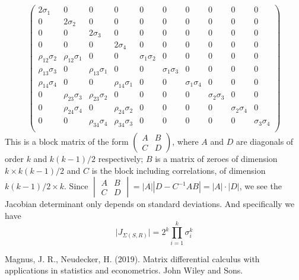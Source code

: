 \documentclass{article}
\begin{document}
$$
\begin{pmatrix}
2 \sigma_1 & 0 & 0 & 0 & 0 & 0 & 0 & 0 & 0 & 0 \\ 
0 & 2 \sigma_2 & 0 & 0 & 0 & 0 & 0 & 0 & 0 & 0 \\ 
0 & 0 & 2 \sigma_3 & 0 & 0 & 0 & 0 & 0 & 0 & 0 \\ 
0 & 0 & 0 & 2 \sigma_4 & 0 & 0 & 0 & 0 & 0 & 0 \\ 
\rho_{12} \sigma_2 & \rho_{12} \sigma_1 & 0 & 0 & \sigma_1 \sigma_2 & 0 & 0 & 0 & 0 & 0 \\
\rho_{13} \sigma_3 & 0 &\rho_{13} \sigma_1  & 0 &  0 & \sigma_1 \sigma_3 & 0 & 0 & 0 & 0 \\
\rho_{14} \sigma_4 & 0 & 0 &  \rho_{14} \sigma_1 & 0 & 0 & \sigma_1 \sigma_4 & 0 & 0 & 0  \\
0 & \rho_{23} \sigma_3 & \rho_{23} \sigma_2 & 0 & 0 & 0 & 0 & \sigma_2 \sigma_3 & 0 & 0 \\
0 & \rho_{24} \sigma_4 & 0 & \rho_{24} \sigma_2 & 0 & 0 & 0 & 0 & \sigma_2 \sigma_4 & 0 \\
0 & 0 & \rho_{34} \sigma_4 & \rho_{34} \sigma_3 & 0 & 0 & 0 & 0 & 0 & \sigma_3 \sigma_4 \\
\end{pmatrix}
$$
This is a block matrix of the form $\begin{pmatrix} A & B \\ C & D\end{pmatrix}$, where $A$ and $D$ are diagonals of order $k$ and $k(k-1)/2$ respectively; $B$ is a matrix of zeroes of dimension $k \times k(k-1)/2$ and $C$ is the block including correlations, of dimension $k(k-1)/2 \times k$. Since $\begin{vmatrix} A & B \\ C & D\end{vmatrix} = |A| |D - C^{-1}AB| = |A| \cdot |D|$,  we see the Jacobian determinant only depends on standard deviations. And specifically we have
\begin{equation}
\mid J_{\Sigma(S,R)}\mid = 2^k \prod_{i=1}^k \sigma_i^k
\end{equation}

 


\begin{thebibliography}{6}
 Magnus, J. R., Neudecker, H. (2019). Matrix differential calculus with applications in statistics and econometrics. John Wiley and Sons.
\end{thebibliography}
\end{document}
